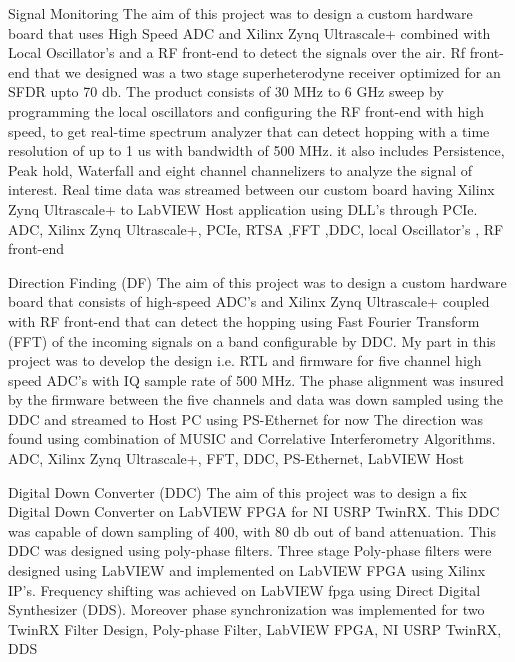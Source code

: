 %
%
%


\begin{projects}
  
	\project
	{Signal Monitoring}{}
	{{} {}{} }
	{The aim of this project was to design a custom hardware board that uses High Speed ADC and Xilinx Zynq Ultrascale+ combined with Local Oscillator's and a RF front-end to detect the signals over the air. Rf front-end that we designed was a two stage superheterodyne receiver optimized for an SFDR upto 70 db. The product consists of 30 MHz to 6 GHz sweep by programming the local oscillators and configuring the RF front-end with high speed, to get real-time spectrum analyzer that can detect hopping with a time resolution of up to 1 us with bandwidth of 500 MHz. it also includes Persistence, Peak hold, Waterfall and eight channel channelizers to analyze the signal of interest. Real time data was streamed between our custom board having Xilinx Zynq Ultrascale+ to LabVIEW Host application using DLL's through PCIe.}
	{ADC, Xilinx Zynq Ultrascale+, PCIe, RTSA ,FFT ,DDC, local Oscillator's , RF front-end}
	
  \emptySeparator
	\project
	{Direction Finding (DF)}{}
	{{} {}{} }
	{The aim of this project was to design a custom hardware board that consists of high-speed ADC's and Xilinx Zynq Ultrascale+ coupled with RF front-end that can detect the hopping using Fast Fourier Transform (FFT) of the incoming signals on a band configurable by DDC. My part in this project was to develop the design i.e. RTL and firmware for five channel high speed ADC's with IQ sample rate of 500 MHz. The phase alignment was insured by the firmware between the five channels and data was down sampled using the DDC and streamed to Host PC using PS-Ethernet for now The direction was found using combination of MUSIC and Correlative Interferometry Algorithms.}
	{ADC, Xilinx Zynq Ultrascale+, FFT, DDC, PS-Ethernet, LabVIEW Host}
	
  \emptySeparator

  	\project
	{Digital Down Converter (DDC)}{}
	{{} {}{} }
	{The aim of this project was to design a fix Digital Down Converter on LabVIEW FPGA for NI USRP TwinRX. This DDC was capable of down sampling of 400, with 80 db out of band attenuation. This DDC was designed using poly-phase filters. Three stage Poly-phase filters were designed using LabVIEW and implemented on LabVIEW FPGA using Xilinx IP's. Frequency shifting was achieved on LabVIEW fpga using Direct Digital Synthesizer (DDS). Moreover phase synchronization was implemented for two TwinRX}
	{Filter Design, Poly-phase Filter, LabVIEW FPGA, NI USRP TwinRX, DDS}
	

\end{projects}
